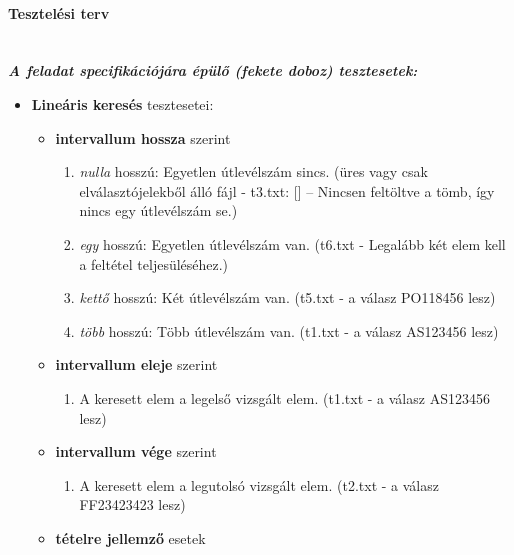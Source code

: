 \documentclass[12pt]{report}
\begin{document}
\paragraph{Tesztelési terv} \hspace{0pt} \\

\textit{\textbf{A feladat specifikációjára épülő (fekete doboz) tesztesetek:}}
\begin{itemize}[noitemsep]
\item \textbf{Lineáris keresés} tesztesetei:
\begin{itemize}[noitemsep]
\item \textbf{intervallum hossza} szerint
\begin{enumerate}[noitemsep]
\item \textit{nulla} hosszú: Egyetlen útlevélszám sincs. (üres vagy csak elválasztójelekből álló fájl - t3.txt: [] – Nincsen feltöltve a tömb, így nincs egy útlevélszám se.) 
\item \textit{egy} hosszú: Egyetlen útlevélszám van. (t6.txt - Legalább két elem kell a feltétel teljesüléséhez.)
\item \textit{kettő} hosszú: Két útlevélszám van. (t5.txt - a válasz PO118456 lesz)
\item \textit{több} hosszú: Több útlevélszám van. (t1.txt - a válasz AS123456 lesz)
\end{enumerate}
\end{itemize}
\begin{itemize}[noitemsep]
\item \textbf{intervallum eleje} szerint
\begin{enumerate}[noitemsep]
\item A keresett elem a legelső vizsgált elem. (t1.txt - a válasz AS123456 lesz)
\end{enumerate}
\end{itemize}
\begin{itemize}[noitemsep]
\item \textbf{intervallum vége} szerint
\begin{enumerate}[noitemsep]
\item A keresett elem a legutolsó vizsgált elem. (t2.txt - a válasz FF23423423 lesz)
\end{enumerate}
\end{itemize}
\begin{itemize}[noitemsep]
\item \textbf{tételre jellemző} esetek
\begin{enumerate}[noitemsep]

\end{enumerate}
\end{itemize}
\end{itemize}
\end{document}
